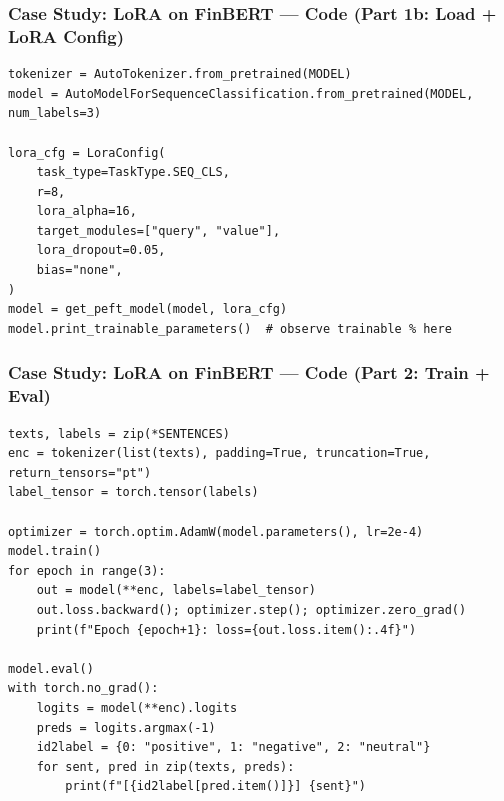 \documentclass[9pt,t]{beamer}
\begin{document}
\begin{frame}[fragile]
\frametitle{Case Study: LoRA on FinBERT --- Code (Part 1b: Load + LoRA Config)}

{\footnotesize
\begin{lstlisting}
tokenizer = AutoTokenizer.from_pretrained(MODEL)
model = AutoModelForSequenceClassification.from_pretrained(MODEL, num_labels=3)

lora_cfg = LoraConfig(
    task_type=TaskType.SEQ_CLS,
    r=8,
    lora_alpha=16,
    target_modules=["query", "value"],
    lora_dropout=0.05,
    bias="none",
)
model = get_peft_model(model, lora_cfg)
model.print_trainable_parameters()  # observe trainable % here
\end{lstlisting}
}
\end{frame}

\begin{frame}[fragile]
\frametitle{Case Study: LoRA on FinBERT --- Code (Part 2: Train + Eval)}

{\footnotesize
\begin{lstlisting}
texts, labels = zip(*SENTENCES)
enc = tokenizer(list(texts), padding=True, truncation=True, return_tensors="pt")
label_tensor = torch.tensor(labels)

optimizer = torch.optim.AdamW(model.parameters(), lr=2e-4)
model.train()
for epoch in range(3):
    out = model(**enc, labels=label_tensor)
    out.loss.backward(); optimizer.step(); optimizer.zero_grad()
    print(f"Epoch {epoch+1}: loss={out.loss.item():.4f}")

model.eval()
with torch.no_grad():
    logits = model(**enc).logits
    preds = logits.argmax(-1)
    id2label = {0: "positive", 1: "negative", 2: "neutral"}
    for sent, pred in zip(texts, preds):
        print(f"[{id2label[pred.item()]}] {sent}")
\end{lstlisting}
}
\end{frame}
\end{document}
